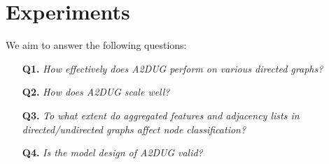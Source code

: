 \section{Experiments}
\label{sec:experiments}


We aim to answer the following questions: 
\begin{itemize}
    \item[\textbf{Q1.}] \textit{How effectively does A2DUG perform on various directed graphs?} 
    \item[\textbf{Q2.}] \textit{How does A2DUG scale well?} 
    \item[\textbf{Q3.}] \textit{To what extent do aggregated features and adjacency lists in directed/undirected graphs affect node classification?}
    \item[\textbf{Q4.}] \textit{Is the model design of A2DUG valid?}
\end{itemize}


